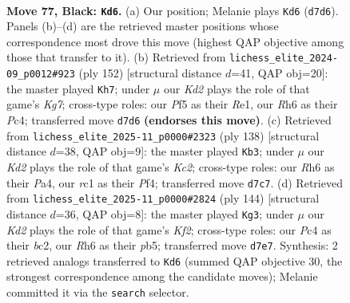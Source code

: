 \documentclass[11pt]{article}
\begin{document}
\begin{figure}[p]\centering
\begin{subfigure}{0.46\textwidth}\centering
\resizebox{\linewidth}{!}{%
\newchessgame
\chessboard[
  setfen={8/3k4/p6r/Ppp2p1p/2p2P1P/4PKP1/1P6/2R5 b - - 0 77},
  showmover=false,
  pgfstyle=straightmove, color=movearrow, markmove={d7-d6}
]}
\caption{}
\end{subfigure}\hfill
\begin{subfigure}{0.46\textwidth}\centering
\resizebox{\linewidth}{!}{%
\newchessgame
\chessboard[
  setfen={8/2pk2K1/1p1p2P1/p2P4/P1P5/1P3r2/8/4R3 w - - 14 77},
  showmover=false,
  pgfstyle=straightmove, color=movearrow, markmove={g7-h7}
]}
\caption{}
\end{subfigure}
\\[4pt]
\begin{subfigure}{0.46\textwidth}\centering
\resizebox{\linewidth}{!}{%
\newchessgame
\chessboard[
  setfen={8/8/1p2k1p1/pP1p1p1p/P2P1P1P/4P3/2K5/8 w - - 33 70},
  showmover=false,
  pgfstyle=straightmove, color=movearrow, markmove={c2-b3}
]}
\caption{}
\end{subfigure}\hfill
\begin{subfigure}{0.46\textwidth}\centering
\resizebox{\linewidth}{!}{%
\newchessgame
\chessboard[
  setfen={8/5kp1/pB3p1p/1p1p3P/3P2P1/P1P2P2/2b2K2/8 w - - 25 73},
  showmover=false,
  pgfstyle=straightmove, color=movearrow, markmove={f2-g3}
]}
\caption{}
\end{subfigure}
\caption{\textbf{Move 77, Black: \texttt{Kd6}.} (a) Our position; Melanie plays \texttt{Kd6} (\texttt{d7d6}). Panels (b)--(d) are the retrieved master positions whose correspondence most drove this move (highest QAP objective among those that transfer to it). (b) Retrieved from \texttt{lichess\_elite\_2024-09\_p0012\#923} (ply 152) [structural distance $d$=41, QAP obj=20]: the master played \texttt{Kh7}; under $\mu$ our \emph{Kd2} plays the role of that game's \emph{Kg7}; cross-type roles: our \emph{P}f5 as their \emph{R}e1, our \emph{R}h6 as their \emph{P}c4; transferred move \texttt{d7d6} \textbf{(endorses this move)}. (c) Retrieved from \texttt{lichess\_elite\_2025-11\_p0000\#2323} (ply 138) [structural distance $d$=38, QAP obj=9]: the master played \texttt{Kb3}; under $\mu$ our \emph{Kd2} plays the role of that game's \emph{Kc2}; cross-type roles: our \emph{R}h6 as their \emph{P}a4, our \emph{r}c1 as their \emph{P}f4; transferred move \texttt{d7c7}. (d) Retrieved from \texttt{lichess\_elite\_2025-11\_p0000\#2824} (ply 144) [structural distance $d$=36, QAP obj=8]: the master played \texttt{Kg3}; under $\mu$ our \emph{Kd2} plays the role of that game's \emph{Kf2}; cross-type roles: our \emph{P}c4 as their \emph{b}c2, our \emph{R}h6 as their \emph{p}b5; transferred move \texttt{d7e7}. Synthesis: 2 retrieved analogs transferred to \texttt{Kd6} (summed QAP objective 30, the strongest correspondence among the candidate moves); Melanie committed it via the \texttt{search} selector.}
\label{fig:thought-m153}
\end{figure}
\end{document}
